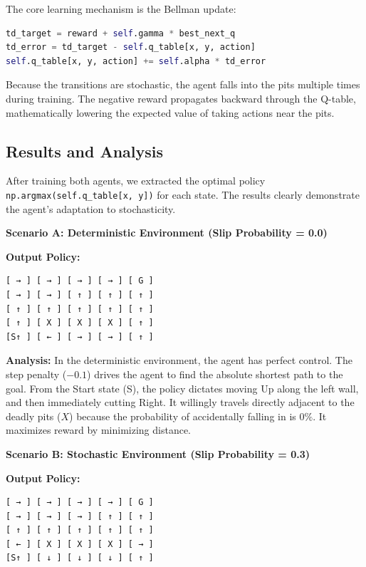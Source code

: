 The core learning mechanism is the Bellman update:
\begin{lstlisting}[language=Python]
td_target = reward + self.gamma * best_next_q
td_error = td_target - self.q_table[x, y, action]
self.q_table[x, y, action] += self.alpha * td_error
\end{lstlisting}

Because the transitions are stochastic, the agent falls into the pits multiple times during training. The negative reward propagates backward through the Q-table, mathematically lowering the expected value of taking actions near the pits.

\newpage
\subsection{\textcolor{secondary}{Results and Analysis}}
After training both agents, we extracted the optimal policy \texttt{np.argmax(self.q\_table[x, y])} for each state. The results clearly demonstrate the agent's adaptation to stochasticity.

\textbf{\textcolor{primary}{Scenario A: Deterministic Environment (Slip Probability = 0.0)}}

\textbf{Output Policy:}
\begin{verbatim}
[ → ] [ → ] [ → ] [ → ] [ G ] 
[ → ] [ → ] [ ↑ ] [ ↑ ] [ ↑ ] 
[ ↑ ] [ ↑ ] [ ↑ ] [ ↑ ] [ ↑ ] 
[ ↑ ] [ X ] [ X ] [ X ] [ ↑ ] 
[S↑ ] [ ← ] [ → ] [ → ] [ ↑ ] 
\end{verbatim}

\textbf{Analysis:} In the deterministic environment, the agent has perfect control. The step penalty ($-0.1$) drives the agent to find the absolute shortest path to the goal. From the Start state (S), the policy dictates moving Up along the left wall, and then immediately cutting Right. It willingly travels directly adjacent to the deadly pits ($X$) because the probability of accidentally falling in is $0\%$. It maximizes reward by minimizing distance.

\vspace{0.5cm}
\textbf{\textcolor{primary}{Scenario B: Stochastic Environment (Slip Probability = 0.3)}}

\textbf{Output Policy:}
\begin{verbatim}
[ → ] [ → ] [ → ] [ → ] [ G ] 
[ → ] [ → ] [ → ] [ ↑ ] [ ↑ ] 
[ ↑ ] [ ↑ ] [ ↑ ] [ ↑ ] [ ↑ ] 
[ ← ] [ X ] [ X ] [ X ] [ → ] 
[S↑ ] [ ↓ ] [ ↓ ] [ ↓ ] [ ↑ ] 
\end{verbatim}

